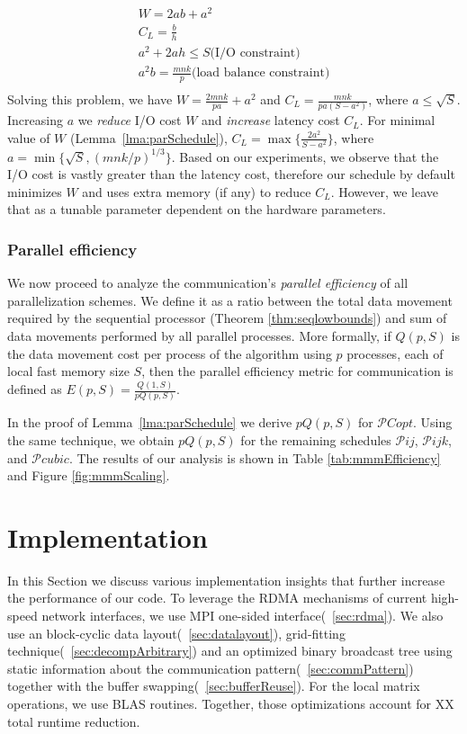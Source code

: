 \documentclass[sigplan,review,anonymous]{acmart}\settopmatter{printfolios=true,printccs=false,printacmref=false}
\begin{document}
\begin{multline}
\\
W = 2ab + a^2 \\
C_L = \frac{b}{h} \\
a^2 + 2ah \le S \text{(I/O constraint)} \\
a^2b = \frac{mnk}{p} \text{(load balance constraint)} \\
\end{multline}
Solving this problem, we have $W = \frac{2mnk}{pa} + a^2$ and $C_L 
= 
\frac{mnk}{pa(S-a^2)}$, 
where $a \le \sqrt{S}$. Increasing $a$ we \emph{reduce} I/O cost 
$W$ and \emph{increase} latency cost $C_L$. For minimal value of 
$W$ (Lemma~\ref{lma:parSchedule}),  $C_L = \max\{\frac{2a^2}{S - 
a^2}\}$, where $a = \min\{\sqrt{S}, (mnk/p)^{1/3} \}$. Based on our 
experiments, we observe that the I/O cost is vastly greater than the 
latency cost, therefore our schedule by default minimizes $W$ and uses 
extra memory (if any) to reduce $C_L$. However, we leave that as a tunable 
parameter dependent on the hardware parameters.

\subsubsection{Parallel efficiency} 
We now proceed to analyze the 
communication's 
\emph{parallel efficiency} of all parallelization schemes. We define it as a 
ratio between  
the total data movement required by the sequential processor (Theorem 
\ref{thm:seqlowbounds}) and sum of data movements performed by all 
parallel
processes. More 
formally, if $Q(p,S)$ is the data movement cost per process of the 
algorithm 
using $p$ 
processes, each of local fast memory size $S$, then the parallel 
efficiency 
metric for communication is defined as $E(p,S) = 
\frac{Q(1,S)}{pQ(p,S)}$.

In the proof of Lemma~\ref{lma:parSchedule} we derive $pQ(p,S)$ for 
$\mathcal{P}Copt$. Using the same technique, we obtain $pQ(p,S)$ for the 
remaining schedules $\mathcal{P}ij$, $\mathcal{P}ijk$, and $\mathcal{P}cubic$.
The results of our analysis is shown in Table \ref{tab:mmmEfficiency} 
and 
Figure \ref{fig:mmmScaling}.




\section{Implementation}
\label{sec:implementation}
In this Section we discuss various implementation insights that further 
increase the performance of our code. To leverage the RDMA mechanisms of 
current high-speed network interfaces, we use MPI one-sided 
interface(~\cref{sec:rdma}). We also use an block-cyclic data 
layout(~\cref{sec:datalayout}), grid-fitting 
technique(~\cref{sec:decompArbitrary}) and an optimized binary broadcast 
tree using static information about
the communication pattern(~\cref{sec:commPattern}) together with the buffer 
swapping(~\cref{sec:bufferReuse}). For the local matrix operations, we use 
BLAS routines. Together, those optimizations account 
for XX total runtime 
reduction. 
\end{document}
